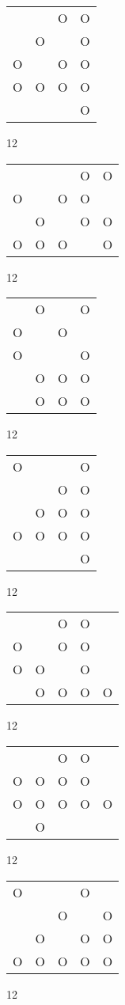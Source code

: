 \begin{tabular}{|m{0.2cm}m{0.2cm}m{0.2cm}m{0.2cm}|}\hline
 & &O&O\\
 &O& &O\\
O& &O&O\\
O&O&O&O\\
 & & &O\\
\hline\end{tabular}12
\begin{tabular}{|m{0.2cm}m{0.2cm}m{0.2cm}m{0.2cm}m{0.2cm}|}\hline
 & & &O&O\\
O& &O&O& \\
 &O& &O&O\\
O&O&O& &O\\
\hline\end{tabular}12
\begin{tabular}{|m{0.2cm}m{0.2cm}m{0.2cm}m{0.2cm}|}\hline
 &O& &O\\
O& &O& \\
O& & &O\\
 &O&O&O\\
 &O&O&O\\
\hline\end{tabular}12
\begin{tabular}{|m{0.2cm}m{0.2cm}m{0.2cm}m{0.2cm}|}\hline
O& & &O\\
 & &O&O\\
 &O&O&O\\
O&O&O&O\\
 & & &O\\
\hline\end{tabular}12
\begin{tabular}{|m{0.2cm}m{0.2cm}m{0.2cm}m{0.2cm}m{0.2cm}|}\hline
 & &O&O& \\
O& &O&O& \\
O&O& &O& \\
 &O&O&O&O\\
\hline\end{tabular}12
\begin{tabular}{|m{0.2cm}m{0.2cm}m{0.2cm}m{0.2cm}m{0.2cm}|}\hline
 & &O&O& \\
O&O&O&O& \\
O&O&O&O&O\\
 &O& & & \\
\hline\end{tabular}12
\begin{tabular}{|m{0.2cm}m{0.2cm}m{0.2cm}m{0.2cm}m{0.2cm}|}\hline
O& & &O& \\
 & &O& &O\\
 &O& &O&O\\
O&O&O&O&O\\
\hline\end{tabular}12
